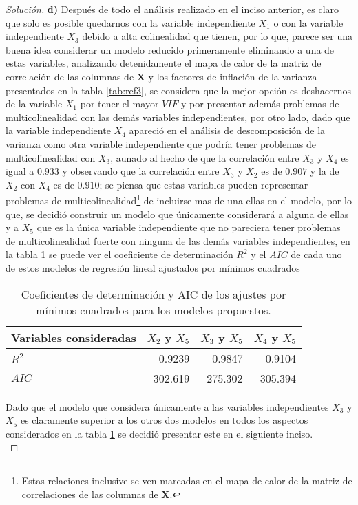 \documentclass[10.5pt,notitlepage]{article}
\newenvironment{solucion}
  {\begin{proof}[Solución]}
  {\end{proof}}
\theoremstyle{plain}
\begin{document}
\begin{solucion}
\noindent \textbf{d)} Después de todo el análisis realizado en el inciso anterior, es claro que solo es posible quedarnos con la variable independiente \(X_1\) o con la variable independiente \(X_3\) debido a alta colinealidad que tienen, por lo que, parece ser una buena idea considerar un modelo reducido primeramente eliminando a una de estas variables, analizando detenidamente el mapa de calor de la matriz de correlación de las columnas de \(\mathbf{X}\) y los factores de inflación de la varianza presentados en la tabla \ref{tab:ref3}, se considera que la mejor opción es deshacernos de la variable \(X_1\) por tener el mayor \(VIF\) y por presentar además problemas de multicolinealidad con las demás variables independientes, por otro lado, dado que la variable independiente \(X_4\) apareció en el análisis de descomposición de la varianza como otra variable independiente que podría tener problemas de multicolinealidad con \(X_3\), aunado al hecho de que la correlación entre \(X_3\) y \(X_4\) es igual a \(0.933\) y observando que la correlación entre \(X_3\) y \(X_2\) es de \(0.907\) y la de \(X_2\) con \(X_4\) es de \(0.910\); se piensa que estas variables pueden representar problemas de multicolinealidad\footnote{Estas relaciones inclusive se ven marcadas en el mapa de calor de la matriz de correlaciones de las columnas de \(\mathbf{X}\).} de incluirse mas de una ellas en el modelo, por lo que, se decidió construir un modelo que únicamente considerará a alguna de ellas y a \(X_5\) que es la única variable independiente que no pareciera tener problemas de multicolinealidad fuerte con ninguna de las demás variables independientes, en la tabla \ref{tab:improvisada} se puede ver el coeficiente de determinación \(R^2\) y el \(AIC\) de cada uno de estos modelos de regresión lineal ajustados por mínimos cuadrados 
\begin{table}[H]
        \centering
        \begin{tabular}{@{}l@{\hskip 0.3in}r@{\hskip 0.3in}r@{\hskip 0.3in}r@{}}
            \toprule
            Variables consideradas& \(X_2\) y \(X_5\) & \(X_3\) y \(X_5\)& \(X_4\) y \(X_5\) \\
            \midrule
            \(R^2\) &0.9239  & 0.9847 &0.9104 \\  
            \(AIC\) &302.619  &275.302 &305.394 \\  
            \bottomrule
        \end{tabular}
        \caption{Coeficientes de determinación y AIC de los ajustes por mínimos cuadrados para los modelos propuestos.}
        \label{tab:improvisada}
\end{table}
Dado que el modelo que considera únicamente a las variables independientes \(X_3\) y \(X_5\) es claramente superior a los otros dos modelos en todos los aspectos considerados en la tabla \ref{tab:improvisada} se decidió presentar este en el siguiente inciso.\\ 


\end{solucion}
\end{document}

